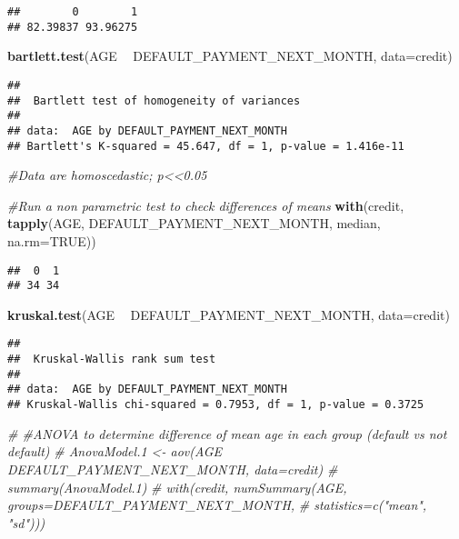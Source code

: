 \documentclass[]{article}
\newenvironment{Shaded}{\begin{snugshade}}{\end{snugshade}}
\newcommand{\KeywordTok}[1]{\textcolor[rgb]{0.13,0.29,0.53}{\textbf{#1}}}
\newcommand{\DataTypeTok}[1]{\textcolor[rgb]{0.13,0.29,0.53}{#1}}
\newcommand{\StringTok}[1]{\textcolor[rgb]{0.31,0.60,0.02}{#1}}
\newcommand{\CommentTok}[1]{\textcolor[rgb]{0.56,0.35,0.01}{\textit{#1}}}
\newcommand{\OtherTok}[1]{\textcolor[rgb]{0.56,0.35,0.01}{#1}}
\newcommand{\OperatorTok}[1]{\textcolor[rgb]{0.81,0.36,0.00}{\textbf{#1}}}
\newcommand{\NormalTok}[1]{#1}
\begin{document}
\begin{verbatim}
##        0        1 
## 82.39837 93.96275
\end{verbatim}

\begin{Shaded}
\begin{Highlighting}[]
\KeywordTok{bartlett.test}\NormalTok{(AGE }\OperatorTok{~}\StringTok{ }\NormalTok{DEFAULT_PAYMENT_NEXT_MONTH, }\DataTypeTok{data=}\NormalTok{credit)}
\end{Highlighting}
\end{Shaded}

\begin{verbatim}
## 
##  Bartlett test of homogeneity of variances
## 
## data:  AGE by DEFAULT_PAYMENT_NEXT_MONTH
## Bartlett's K-squared = 45.647, df = 1, p-value = 1.416e-11
\end{verbatim}

\begin{Shaded}
\begin{Highlighting}[]
\CommentTok{#Data are homoscedastic; p<<0.05}

\CommentTok{#Run a non parametric test to check differences of means}
\KeywordTok{with}\NormalTok{(credit, }\KeywordTok{tapply}\NormalTok{(AGE, DEFAULT_PAYMENT_NEXT_MONTH, median, }\DataTypeTok{na.rm=}\OtherTok{TRUE}\NormalTok{))}
\end{Highlighting}
\end{Shaded}

\begin{verbatim}
##  0  1 
## 34 34
\end{verbatim}

\begin{Shaded}
\begin{Highlighting}[]
\KeywordTok{kruskal.test}\NormalTok{(AGE }\OperatorTok{~}\StringTok{ }\NormalTok{DEFAULT_PAYMENT_NEXT_MONTH, }\DataTypeTok{data=}\NormalTok{credit)}
\end{Highlighting}
\end{Shaded}

\begin{verbatim}
## 
##  Kruskal-Wallis rank sum test
## 
## data:  AGE by DEFAULT_PAYMENT_NEXT_MONTH
## Kruskal-Wallis chi-squared = 0.7953, df = 1, p-value = 0.3725
\end{verbatim}

\begin{Shaded}
\begin{Highlighting}[]
\CommentTok{# #ANOVA to determine difference of mean age in each group (default vs not default)}
\CommentTok{# AnovaModel.1 <- aov(AGE ~ DEFAULT_PAYMENT_NEXT_MONTH, data=credit)}
\CommentTok{# summary(AnovaModel.1)}
\CommentTok{# with(credit, numSummary(AGE, groups=DEFAULT_PAYMENT_NEXT_MONTH, }
\CommentTok{#   statistics=c("mean", "sd")))}
\end{Highlighting}
\end{Shaded}
\end{document}
